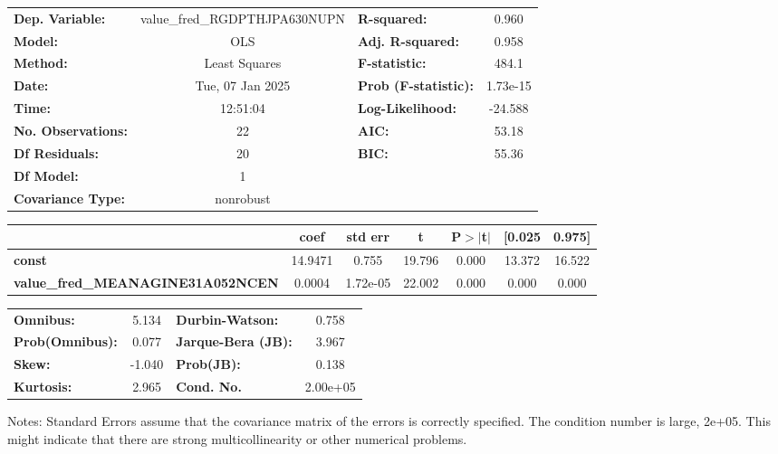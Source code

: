 \begin{center}
\begin{tabular}{lclc}
\toprule
\textbf{Dep. Variable:}                   & value\_fred\_RGDPTHJPA630NUPN & \textbf{  R-squared:         } &     0.960   \\
\textbf{Model:}                           &              OLS              & \textbf{  Adj. R-squared:    } &     0.958   \\
\textbf{Method:}                          &         Least Squares         & \textbf{  F-statistic:       } &     484.1   \\
\textbf{Date:}                            &        Tue, 07 Jan 2025       & \textbf{  Prob (F-statistic):} &  1.73e-15   \\
\textbf{Time:}                            &            12:51:04           & \textbf{  Log-Likelihood:    } &   -24.588   \\
\textbf{No. Observations:}                &                 22            & \textbf{  AIC:               } &     53.18   \\
\textbf{Df Residuals:}                    &                 20            & \textbf{  BIC:               } &     55.36   \\
\textbf{Df Model:}                        &                  1            & \textbf{                     } &             \\
\textbf{Covariance Type:}                 &           nonrobust           & \textbf{                     } &             \\
\bottomrule
\end{tabular}
\begin{tabular}{lcccccc}
                                          & \textbf{coef} & \textbf{std err} & \textbf{t} & \textbf{P$> |$t$|$} & \textbf{[0.025} & \textbf{0.975]}  \\
\midrule
\textbf{const}                            &      14.9471  &        0.755     &    19.796  &         0.000        &       13.372    &       16.522     \\
\textbf{value\_fred\_MEANAGINE31A052NCEN} &       0.0004  &     1.72e-05     &    22.002  &         0.000        &        0.000    &        0.000     \\
\bottomrule
\end{tabular}
\begin{tabular}{lclc}
\textbf{Omnibus:}       &  5.134 & \textbf{  Durbin-Watson:     } &    0.758  \\
\textbf{Prob(Omnibus):} &  0.077 & \textbf{  Jarque-Bera (JB):  } &    3.967  \\
\textbf{Skew:}          & -1.040 & \textbf{  Prob(JB):          } &    0.138  \\
\textbf{Kurtosis:}      &  2.965 & \textbf{  Cond. No.          } & 2.00e+05  \\
\bottomrule
\end{tabular}
\end{center}

Notes: \newline
 [1] Standard Errors assume that the covariance matrix of the errors is correctly specified. \newline
 [2] The condition number is large,  2e+05. This might indicate that there are \newline
 strong multicollinearity or other numerical problems.